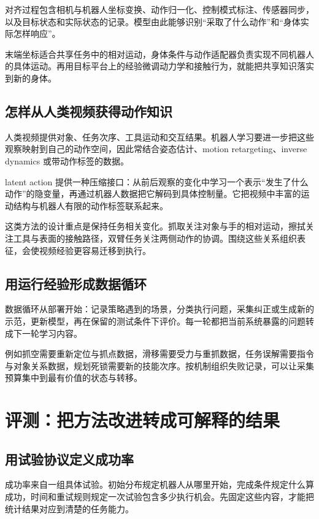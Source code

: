 \documentclass[UTF8,a4paper,11pt,oneside,openany,fontset=none]{ctexbook}
\begin{document}
对齐过程包含相机与机器人坐标变换、动作归一化、控制模式标注、传感器同步，以及目标状态和实际状态的记录。模型由此能够识别``采取了什么动作''和``身体实际怎样响应''。

末端坐标适合共享任务中的相对运动，身体条件与动作适配器负责实现不同机器人的具体运动。再用目标平台上的经验微调动力学和接触行为，就能把共享知识落实到新的身体。

\section{怎样从人类视频获得动作知识}

人类视频提供对象、任务次序、工具运动和交互结果。机器人学习要进一步把这些观察映射到自己的动作空间，因此常结合姿态估计、motion retargeting、inverse dynamics 或带动作标签的数据。

latent action 提供一种压缩接口：从前后观察的变化中学习一个表示``发生了什么动作''的隐变量，再通过机器人数据把它解码到具体控制量。它把视频中丰富的运动结构与机器人有限的动作标签联系起来。

这类方法的设计重点是保持任务相关变化。抓取关注对象与手的相对运动，擦拭关注工具与表面的接触路径，双臂任务关注两侧动作的协调。围绕这些关系组织表征，会使视频经验更容易迁移到执行。

\section{用运行经验形成数据循环}

数据循环从部署开始：记录策略遇到的场景，分类执行问题，采集纠正或生成新的示范，更新模型，再在保留的测试条件下评价。每一轮都把当前系统暴露的问题转成下一轮学习内容。

例如抓空需要重新定位与抓点数据，滑移需要受力与重抓数据，任务误解需要指令与对象关系数据，规划死锁需要新的技能次序。按机制组织失败记录，可以让采集预算集中到最有价值的状态与转移。

\chapter{评测：把方法改进转成可解释的结果}

\section{用试验协议定义成功率}

成功率来自一组具体试验。初始分布规定机器人从哪里开始，完成条件规定什么算成功，时间和重试规则规定一次试验包含多少执行机会。先固定这些内容，才能把统计结果对应到清楚的任务能力。
\end{document}
